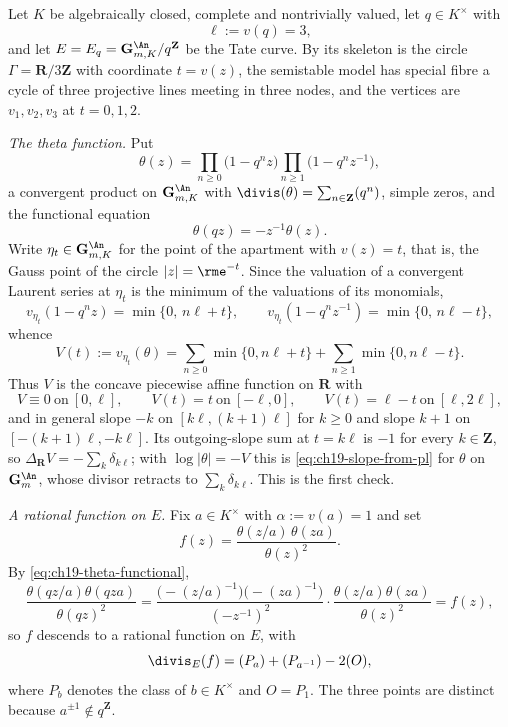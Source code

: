 \begin{example}
\label{ex:ch19-tate-slope}
Let $K$ be algebraically closed, complete and nontrivially valued, let
$q\in K^\times$ with
\[
                     \ell:=v(q)=3,
\]
and let $E=E_q=\mathbf G_{m,K}^{\An}/q^{\mathbf Z}$ be the Tate curve.  By
 its skeleton is the circle
$\Gamma=\mathbf R/3\mathbf Z$ with coordinate $t=v(z)$, the semistable
model has special fibre a cycle of three projective lines meeting in three
nodes, and the vertices are $v_1,v_2,v_3$ at $t=0,1,2$.

\emph{The theta function.}  Put
\[
 \theta(z)=\prod_{n\geq0}\bigl(1-q^nz\bigr)
           \prod_{n\geq1}\bigl(1-q^nz^{-1}\bigr),
\]
a convergent product on $\mathbf G_{m,K}^{\An}$ with
$\divis(\theta)=\sum_{n\in\mathbf Z}(q^n)$, simple zeros, and the
functional equation
\begin{equation}
\label{eq:ch19-theta-functional}
 \theta(qz)=-z^{-1}\theta(z).
\end{equation}
Write $\eta_t\in\mathbf G_{m,K}^{\An}$ for the point of the apartment with
$v(z)=t$, that is, the Gauss point of the circle $|z|=\rme^{-t}$.  Since
the valuation of a convergent Laurent series at $\eta_t$ is the minimum of
the valuations of its monomials,
\[
 v_{\eta_t}(1-q^nz)=\min\{0,\,n\ell+t\},
 \qquad
 v_{\eta_t}(1-q^nz^{-1})=\min\{0,\,n\ell-t\},
\]
whence
\begin{equation}
\label{eq:ch19-theta-valuation}
 V(t):=v_{\eta_t}(\theta)
      =\sum_{n\geq0}\min\{0,n\ell+t\}
       +\sum_{n\geq1}\min\{0,n\ell-t\}.
\end{equation}
Thus $V$ is the concave piecewise affine function on $\mathbf R$ with
\[
 V\equiv0\ \text{on}\ [0,\ell],\qquad
 V(t)=t\ \text{on}\ [-\ell,0],\qquad
 V(t)=\ell-t\ \text{on}\ [\ell,2\ell],
\]
and in general slope $-k$ on $[k\ell,(k+1)\ell]$ for $k\geq0$ and
slope $k+1$ on $[-(k+1)\ell,-k\ell]$.  Its outgoing-slope sum at
$t=k\ell$ is $-1$ for every $k\in\mathbf Z$, so
$\Delta_{\mathbf R}V=-\sum_k\delta_{k\ell}$; with
$\log|\theta|=-V$ this is \eqref{eq:ch19-slope-from-pl} for $\theta$ on
$\mathbf G_m^{\An}$, whose divisor retracts to
$\sum_k\delta_{k\ell}$.  This is the first check.

\emph{A rational function on $E$.}  Fix $a\in K^\times$ with
$\alpha:=v(a)=1$ and set
\[
 f(z)=\frac{\theta(z/a)\,\theta(za)}{\theta(z)^2}.
\]
By \eqref{eq:ch19-theta-functional},
\[
 \frac{\theta(qz/a)\theta(qza)}{\theta(qz)^2}
 =\frac{\bigl(-(z/a)^{-1}\bigr)\bigl(-(za)^{-1}\bigr)}{(-z^{-1})^2}
   \cdot\frac{\theta(z/a)\theta(za)}{\theta(z)^2}
 =f(z),
\]
so $f$ descends to a rational function on $E$, with
\[
 \divis_E(f)=(P_a)+(P_{a^{-1}})-2(O),
\]
where $P_b$ denotes the class of $b\in K^\times$ and $O=P_1$.  The
three points are distinct because $a^{\pm1}\notin q^{\mathbf Z}$.


\end{example}
